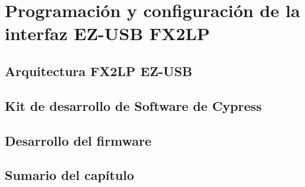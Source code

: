 \chapter{Programación y configuración de la interfaz EZ-USB FX2LP}
	
	\label{cap:cy}
	\section{Arquitectura FX2LP EZ-USB}
		
	\section{Kit de desarrollo de Software de Cypress}
		
	\section{Desarrollo del firmware}
		
	\section{Sumario del capítulo}
		